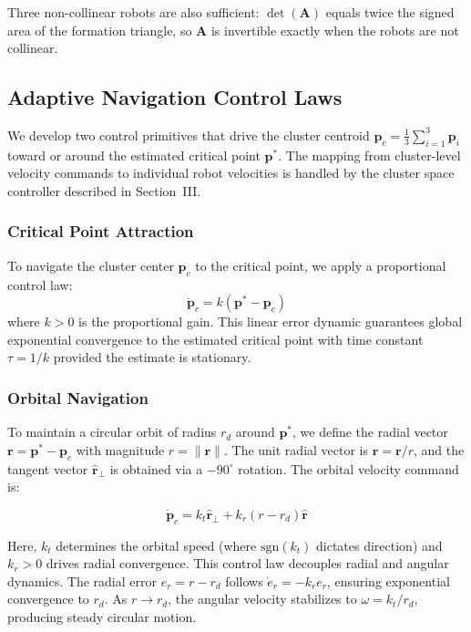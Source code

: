\documentclass[lettersize,journal]{IEEEtran}
\begin{document}
Three non-collinear robots are also sufficient: $\det(\mathbf{A})$ equals twice the signed area of the formation triangle, so $\mathbf{A}$ is invertible exactly when the robots are not collinear.


\subsection{Adaptive Navigation Control Laws}
\label{sec:control_primitives}

We develop two control primitives that drive the cluster centroid $\mathbf{p}_c = \frac{1}{3}\sum_{i=1}^{3}\mathbf{p}_i$ toward or around the estimated critical point $\mathbf{p}^*$. The mapping from cluster-level velocity commands to individual robot velocities is handled by the cluster space controller described in Section~III.

\subsubsection{Critical Point Attraction}
To navigate the cluster center $\mathbf{p}_c$ to the critical point, we apply a proportional control law:
\begin{equation}
\dot{\mathbf{p}}_c = k(\mathbf{p}^* - \mathbf{p}_c)
\end{equation}
where $k > 0$ is the proportional gain. This linear error dynamic guarantees global exponential convergence to the estimated critical point with time constant $\tau = 1/k$ provided the estimate is stationary.

\subsubsection{Orbital Navigation}
To maintain a circular orbit of radius $r_d$ around $\mathbf{p}^*$, we define the radial vector $\mathbf{r} = \mathbf{p}^* - \mathbf{p}_c$ with magnitude $r = \|\mathbf{r}\|$. The unit radial vector is $\hat{\mathbf{r}} = \mathbf{r}/r$, and the tangent vector $\hat{\mathbf{r}}_\perp$ is obtained via a $-90^\circ$ rotation. The orbital velocity command is:

\begin{equation}
\dot{\mathbf{p}}_c = k_t \hat{\mathbf{r}}_\perp + k_r(r - r_d)\hat{\mathbf{r}}
\end{equation}

Here, $k_t$ determines the orbital speed (where $\text{sgn}(k_t)$ dictates direction) and $k_r > 0$ drives radial convergence.
This control law decouples radial and angular dynamics. The radial error $e_r = r - r_d$ follows $\dot{e}_r = -k_r e_r$, ensuring exponential convergence to $r_d$. As $r \to r_d$, the angular velocity stabilizes to $\omega = k_t/r_d$, producing steady circular motion.
\end{document}
